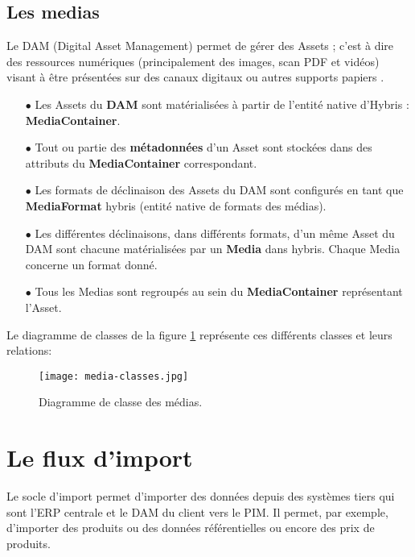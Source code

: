 \subsection{Les medias}

Le DAM (Digital Asset Management) permet de gérer des Assets ; c'est à dire des ressources numériques (principalement des images, scan PDF et vidéos) visant à être présentées sur des canaux digitaux ou autres supports papiers \cite{wiki:dam}.

\medskip

\begin{itemize}
    \item[$\bullet$] Les Assets du \textbf{DAM} sont matérialisées à partir de l'entité native d'Hybris : \textbf{MediaContainer}.
    \smallskip
    \item[$\bullet$] Tout ou partie des \textbf{métadonnées} d'un Asset sont stockées dans des attributs du \textbf{MediaContainer} correspondant.
    \smallskip
    \item[$\bullet$] Les formats de déclinaison des Assets du DAM sont configurés en tant que \textbf{MediaFormat} hybris (entité native de formats des médias).
    \smallskip
    \item[$\bullet$] Les différentes déclinaisons, dans différents formats, d'un même Asset du DAM sont chacune matérialisées par un \textbf{Media} dans hybris. Chaque Media concerne un format donné.
    \medskip
    \item[$\bullet$] Tous les Medias sont regroupés au sein du \textbf{MediaContainer} représentant l'Asset.
\end{itemize}

Le diagramme de classes de la figure \ref{fig:classes-media} représente ces différents classes et leurs relations:

\begin{figure}[ht]
  \centering
  \texttt{[image: media-classes.jpg]}
  \caption{Diagramme de classe des médias.}
  \label{fig:classes-media}
\end{figure}
\FloatBarrier
\section{Le flux d'import}

Le socle d'import permet d'importer des données depuis des systèmes tiers qui sont l'ERP centrale et le DAM du client vers le PIM. Il permet, par exemple, d'importer des produits ou des données référentielles ou encore des prix de produits.

